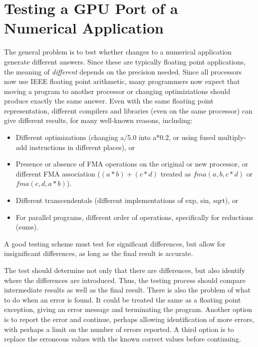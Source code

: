 \section{Testing a GPU Port of a Numerical Application}

The general problem is to test whether changes to a numerical application generate different answers.
Since these are typically floating point applications, the meaning of \emph{different} depends on the precision needed.
Since all processors now use IEEE floating point arithmetic\cite{goldberg.cs.91}, many programmers now expect that moving a program to another processor or changing optimiziations should produce exactly the same answer.
Even with the same floating point representation, different compilers and libraries (even on the same processor) can give different results, for many well-known reasons, including:
\begin{itemize}
\item Different optimizations (changing a/5.0 into a*0.2, or using fused multiply-add instructions in different places), or
\item Presence or absence of FMA operations on the original or new processor, or different FMA association ($(a*b)+(c*d)$ treated as $\textit{fma}(a,b,c*d)$ or $\textit{fma}(c,d,a*b)$).
\item Different transcendentals (different implementations of exp, sin, sqrt), or
\item For parallel programs, different order of operations, specifically for reductions (sums).
\end{itemize}
A good testing scheme must test for significant differences, but allow for insignificant differences, as long as the final result is accurate.

The test should determine not only that there are differences, but also identify where the differences are introduced.
Thus, the testing process should compare intermediate results as well as the final result.
There is also the problem of what to do when an error is found.
It could be treated the same as a floating point exception, giving an error message and terminating the program.
Another option is to report the error and continue, perhaps allowing identification of more errors, with perhaps a limit on the number of errors reported.
A third option is to replace the erroneous values with the known correct values before continuing.


